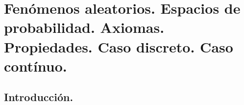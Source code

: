
\chapter{Fen\'omenos aleatorios. Espacios de probabilidad. Axiomas. Propiedades. Caso discreto. Caso cont\'inuo.}


\section{Introducci\'on.}

